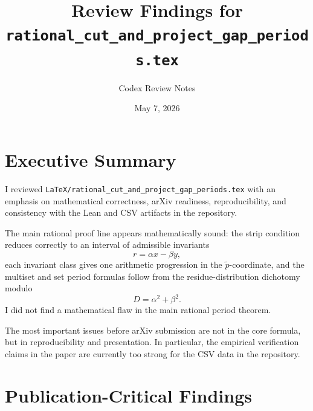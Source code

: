 \documentclass[11pt]{article}
\title{Review Findings for \texttt{rational\_cut\_and\_project\_gap\_periods.tex}}
\author{Codex Review Notes}
\date{May 7, 2026}
\begin{document}
\maketitle

\section*{Executive Summary}

I reviewed
\texttt{LaTeX/rational\_cut\_and\_project\_gap\_periods.tex}
with an emphasis on mathematical correctness, arXiv readiness,
reproducibility, and consistency with the Lean and CSV artifacts in the
repository.

The main rational proof line appears mathematically sound: the strip
condition reduces correctly to an interval of admissible invariants
\[
  r = \alpha x - \beta y,
\]
each invariant class gives one arithmetic progression in the
\(\tilde p\)-coordinate, and the multiset and set period formulas follow
from the residue-distribution dichotomy modulo
\[
  D = \alpha^2+\beta^2.
\]
I did not find a mathematical flaw in the main rational period theorem.

The most important issues before arXiv submission are not in the core
formula, but in reproducibility and presentation.  In particular, the
empirical verification claims in the paper are currently too strong for the
CSV data in the repository.

\section*{Publication-Critical Findings}
\end{document}
